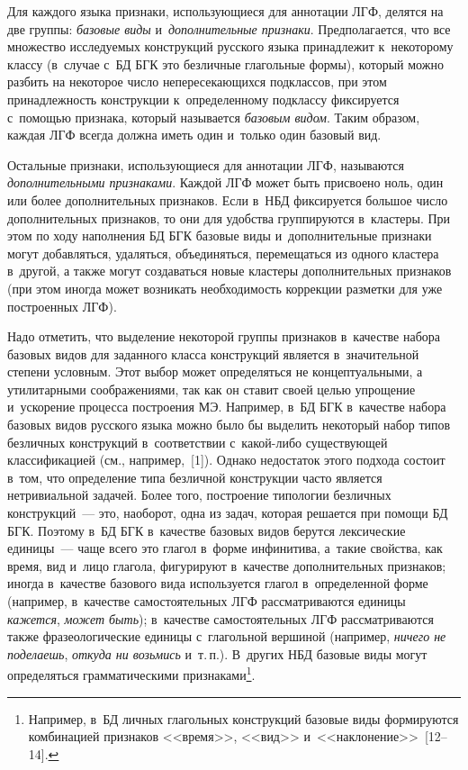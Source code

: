 \begin{multicols}{2}
  Для каждого языка признаки, использующиеся для аннотации ЛГФ, делятся 
на две группы: \textit{базовые виды} и~\textit{дополнительные признаки}. 
Предполагается, что все множество исследуемых конструкций русского языка 
принадлежит к~некоторому классу (в~случае с~БД БГК это безличные 
глагольные формы), который можно разбить на некоторое число 
непересекающихся подклассов, при этом принадлежность конструкции 
к~определенному подклассу фиксируется с~помощью признака, который 
называется \textit{базовым видом}. Таким образом, каждая ЛГФ всегда должна 
иметь один и~только один базовый вид.
{

}
  
  Остальные признаки, использующиеся для аннотации ЛГФ, называются 
\textit{дополнительными признаками}. Каждой ЛГФ может быть присвоено 
ноль, один или более дополнительных признаков. Если в~НБД фиксируется 
большое число дополнительных признаков, то они для удобства группируются 
в~клас\-те\-ры. При этом по ходу наполнения БД БГК базовые виды 
и~дополнительные признаки могут добавляться, удаляться, объединяться, 
перемещаться из одного кластера в~другой, а также могут создаваться новые 
кластеры дополнительных признаков (при этом иногда может возникать 
необходимость коррекции разметки для уже построенных ЛГФ).
  
  Надо отметить, что выделение некоторой группы признаков в~качестве 
набора базовых видов для заданного класса конструкций является 
в~значительной степени условным. Этот выбор может определяться не 
концептуальными, а утилитарными соображениями, так как он ставит своей 
целью упрощение и~ускорение процесса построения МЭ. Например, в~БД БГК 
в~качестве набора базовых видов русского языка можно было бы выделить 
некоторый набор типов безличных конструкций в~соответствии  
с~ка\-кой-ли\-бо существующей классификацией (см., например,~[1]). Однако 
недостаток этого подхода состоит в~том, что определение типа безличной 
конструкции часто является нетривиальной задачей. Более того, построение 
типологии безличных конструкций~--- это, наоборот, одна из задач, которая 
решается при помощи БД БГК. Поэтому в~БД БГК в~качестве базовых видов 
берутся лексические единицы~--- чаще всего это глагол в~форме инфинитива, 
а~такие свойства, как время, вид и~лицо глагола, фигурируют в~качестве 
дополнительных признаков; иногда в~качестве базового вида используется 
глагол в~определенной форме (например, в~качестве самостоятельных ЛГФ 
рассматриваются единицы \textit{кажется}, \textit{может быть}); в~качестве 
самостоятельных ЛГФ рассматриваются также фразеологические единицы 
с~глагольной вершиной (например, \textit{ничего не поделаешь}, \textit{откуда 
ни возьмись} и~т.\,п.). В~других НБД базовые виды могут определяться 
грамматическими признаками\footnote[2]{Например, в~БД личных глагольных конструкций 
базовые виды формируются комбинацией признаков 
<<время>>, <<вид>> и~<<наклонение>>~[12--14].}.


\end{multicols}
